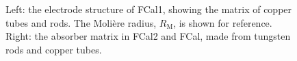 \begin{figure}
	\centering
	\hfill
	\caption{Left: the electrode structure of FCal1, showing the matrix of copper tubes and rods. The Moli{\`e}re radius, $R_{\mathrm{M}}$, is shown for reference. Right: the absorber matrix in FCal2 and FCal, made from tungsten rods and copper tubes.}
	\label{fig:ATLAS-calorimeter-fcal-electrodes}
\end{figure}



